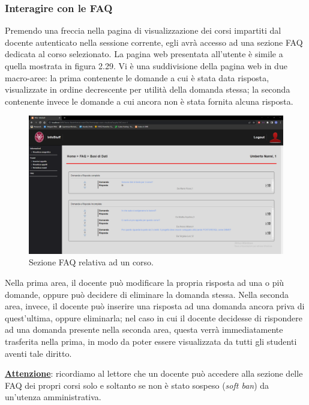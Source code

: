 \documentclass [a4paper,11pt]{book}
\begin{document}
\medskip

\subsubsection{Interagire con le FAQ}

Premendo una freccia nella pagina di visualizzazione dei corsi impartiti dal docente autenticato nella sessione corrente, egli avrà accesso ad una sezione FAQ dedicata al corso selezionato. La pagina web presentata all'utente è simile a quella mostrata in figura 2.29. Vi è una suddivisione della pagina web in due macro-aree: la prima contenente le domande a cui è stata data risposta, visualizzate in ordine decrescente per utilità della domanda stessa; la seconda contenente invece le domande a cui ancora non è stata fornita alcuna risposta. 

\begin{figure}
\centering
\includegraphics[scale=0.3]{figura2-29.png}
\caption{Sezione FAQ relativa ad un corso.}
\end{figure}

Nella prima area, il docente può modificare la propria risposta ad una o più domande, oppure può decidere di eliminare la domanda stessa. Nella seconda area, invece, il docente può inserire una risposta ad una domanda ancora priva di quest'ultima, oppure eliminarla; nel caso in cui il docente decidesse di rispondere ad una domanda presente nella seconda area, questa verrà immediatamente trasferita nella prima, in modo da poter essere visualizzata da tutti gli studenti aventi tale diritto.

\textbf{\underline{Attenzione}}: ricordiamo al lettore che un docente può accedere alla sezione delle FAQ dei propri corsi solo e soltanto se non è stato sospeso (\emph{soft ban}) da un'utenza amministrativa.
\end{document}
